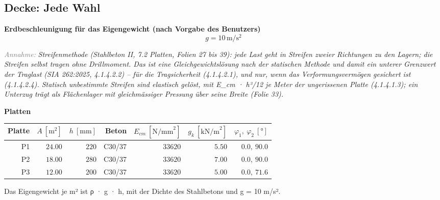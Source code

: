 \documentclass[11pt,a4paper]{article}
\newcommand{\hinweis}[2]{\par\noindent\textcolor{gray}{\textit{#1:}} \textit{#2}\par}
\begin{document}
\subsection{Decke: Jede Wahl}
\noindent\textbf{Erdbeschleunigung für das Eigengewicht (nach Vorgabe des Benutzers)}
\begin{equation*}
g = 10\,\mathrm{m}/\mathrm{s}^{2}
\end{equation*}
\hinweis{Annahme}{Streifenmethode (Stahlbeton II, 7.2 Platten, Folien 27 bis 39): jede Last geht in Streifen zweier Richtungen zu den Lagern; die Streifen selbst tragen ohne Drillmoment. Das ist eine Gleichgewichtslösung nach der statischen Methode und damit ein unterer Grenzwert der Traglast (SIA 262:2025, 4.1.4.2.2) – für die Tragsicherheit (4.1.4.2.1), und nur, wenn das Verformungsvermögen gesichert ist (4.1.4.2.4). Statisch unbestimmte Streifen sind elastisch gelöst, mit E\_cm · h³/12 je Meter der ungerissenen Platte (4.1.4.1.3); ein Unterzug trägt als Flächenlager mit gleichmässiger Pressung über seine Breite (Folie 33).}
\noindent\textbf{Platten}
\begin{longtable}{rrrrrrr}
\hline
Platte & $A\ [\mathrm{m}^{2}]$ & $h\ [\mathrm{mm}]$ & Beton & $E_{cm}\ [\mathrm{N/mm}^{2}]$ & $g_k\ [\mathrm{kN/m}^{2}]$ & $\varphi_1,\ \varphi_2\ [°]$ \\
\hline
\endhead
P1 & $24.00$ & $220$ & C30/37 & $33620$ & $5.50$ & $0.0,\ 90.0$ \\
P2 & $18.00$ & $280$ & C30/37 & $33620$ & $7.00$ & $0.0,\ 90.0$ \\
P3 & $12.00$ & $200$ & C30/37 & $33620$ & $5.00$ & $0.0,\ 71.6$ \\
\hline
\end{longtable}
Das Eigengewicht je m² ist ρ · g · h, mit der Dichte des Stahlbetons und g = 10 m/s².
\end{document}
